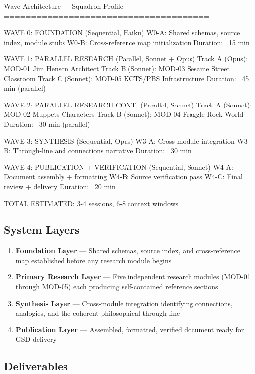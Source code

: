 \documentclass[11pt,letterpaper]{article}
\begin{document}
\begin{asciibox}
Wave Architecture — Squadron Profile
======================================

WAVE 0: FOUNDATION (Sequential, Haiku)
  W0-A: Shared schemas, source index, module stubs
  W0-B: Cross-reference map initialization
  Duration: ~15 min

WAVE 1: PARALLEL RESEARCH (Parallel, Sonnet + Opus)
  Track A (Opus):    MOD-01 Jim Henson Architect
  Track B (Sonnet):  MOD-03 Sesame Street Classroom
  Track C (Sonnet):  MOD-05 KCTS/PBS Infrastructure
  Duration: ~45 min (parallel)

WAVE 2: PARALLEL RESEARCH CONT. (Parallel, Sonnet)
  Track A (Sonnet):  MOD-02 Muppets Characters
  Track B (Sonnet):  MOD-04 Fraggle Rock World
  Duration: ~30 min (parallel)

WAVE 3: SYNTHESIS (Sequential, Opus)
  W3-A: Cross-module integration
  W3-B: Through-line and connections narrative
  Duration: ~30 min

WAVE 4: PUBLICATION + VERIFICATION (Sequential, Sonnet)
  W4-A: Document assembly + formatting
  W4-B: Source verification pass
  W4-C: Final review + delivery
  Duration: ~20 min

TOTAL ESTIMATED: 3-4 sessions, 6-8 context windows
\end{asciibox}

\subsection{System Layers}

\begin{enumerate}[leftmargin=*]
  \item \textbf{Foundation Layer} --- Shared schemas, source index, and cross-reference map established before any research module begins
  \item \textbf{Primary Research Layer} --- Five independent research modules (MOD-01 through MOD-05) each producing self-contained reference sections
  \item \textbf{Synthesis Layer} --- Cross-module integration identifying connections, analogies, and the coherent philosophical through-line
  \item \textbf{Publication Layer} --- Assembled, formatted, verified document ready for GSD delivery
\end{enumerate}

\subsection{Deliverables}
\end{document}
